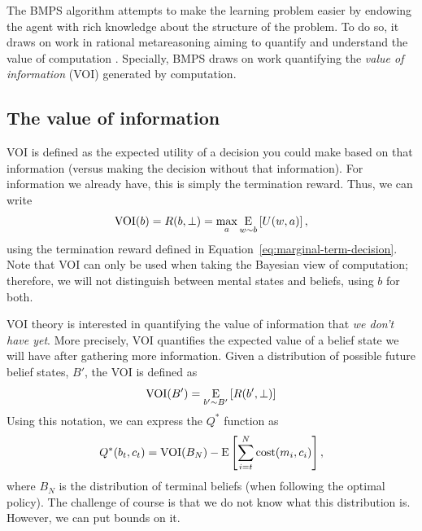 The BMPS algorithm attempts to make the learning problem easier by endowing the agent with rich knowledge about the structure of the problem. To do so, it draws on work in rational metareasoning aiming to quantify and understand the value of computation \citep{matheson1968economic,horvitz1987reasoning,russell1991principles}. Specially, BMPS draws on work quantifying the \emph{value of information} (VOI) generated by computation. 

\subsection{The value of information}

VOI is defined as the expected utility of a decision you could make based on that information (versus making the decision without that information). For information we already have, this is simply the termination reward. Thus, we can write
%
\begin{equation}
  \VOI(b) = R(b, \bot) = \max_a \expectunder{U(w, a)}{w \sim b},
\end{equation}
using the termination reward defined in Equation~\ref{eq:marginal-term-decision}. Note that VOI can only be used when taking the Bayesian view of computation; therefore, we will not distinguish between mental states and beliefs, using $b$ for both.

VOI theory is interested in quantifying the value of information that \emph{we don't have yet}. More precisely, VOI quantifies the expected value of a belief state we will have after gathering more information. Given a distribution of possible future belief states, $B'$, the VOI is defined as
%
\begin{equation}
  \VOI(B') = \expectunder{R(b', \bot)}{b' \sim B'}
\end{equation}
%
Using this notation, we can express the $Q^*$ function as
%
\begin{equation}\label{eq:Q-VOI}
  Q^*(b_t, c_t) = 
    \VOI(B_N) - \E\left[\sum_{i=t}^{\tmax} \cost(m_i, c_i) \right],
\end{equation}
where $B_N$ is the distribution of terminal beliefs (when following the optimal policy). The challenge of course is that we do not know what this distribution is. However, we can put bounds on it.

